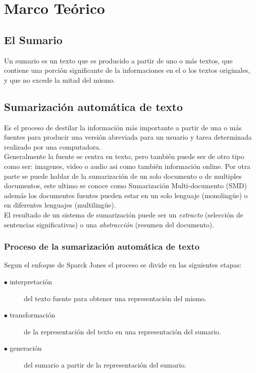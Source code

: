 \chapter{Marco Te\'orico}

\section{El Sumario}
Un sumario es un texto que es producido a partir de uno o m\'as textos,
que contiene una porci\'on significante de la informaciones en el o los
textos originales, y que no excede la mitad del mismo. \cite{EH05} \\
	
\section{Sumarizaci\'on autom\'atica de texto}
Es el proceso de destilar la informaci\'on m\'as importante a partir de
una o m\'as fuentes para producir una versi\'on abreviada para un usuario
y tarea determinada realizado por una computadora. \cite{EL08} \\

Generalmente la fuente se centra en texto, pero tambi\'en puede ser
de otro tipo como ser: imagenes, video o audio asi como tambi\'en
informaci\'on online. Por otra parte se puede hablar de la sumarizaci\'on
de un solo documento o de multiples documentos, este ultimo se conoce
como Sumarizaci\'on Multi-documento (SMD) adem\'as los documentes fuentes
pueden estar en un solo lenguaje (monoling\"ue) o en diferentes lenguajes
(multiling\"ue). \\

El resultado de un sistema de sumarizaci\'on puede ser un \emph{extracto}
(selecci\'on de sentencias significativas) o una \emph{abstracci\'on}
(resumen del documento). \\

\subsection{Proceso de la sumarizaci\'on autom\'atica de texto}
Segun el enfoque de Sparck Jones \cite{KS99} el proceso se divide en las
siguientes etapas:
\begin{description}
	\item[$\bullet$ interpretaci\'on] del texto fuente para obtener una
	representaci\'on del mismo.
	\item[$\bullet$ transformaci\'on] de la representaci\'on del texto
	en una representaci\'on del sumario.
	\item[$\bullet$ generaci\'on] del sumario a partir de la representaci\'on
	del sumario.
\end{description}

